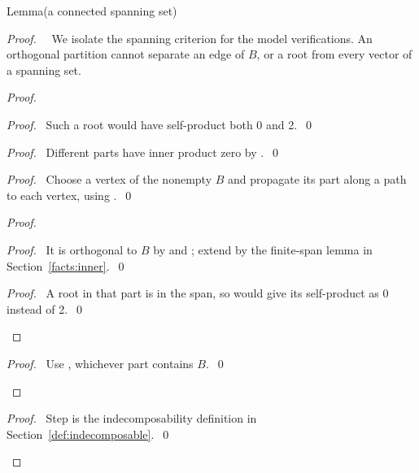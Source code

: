 \begin{namedresult}{Lemma}{(a connected spanning set)}\label{lem:sec3-connected-span}
\end{namedresult}
\begin{proof}
 \pfsketch\ \new\ We isolate the spanning criterion for the model verifications.
 An orthogonal partition cannot separate an edge of $B$, or a root
 from every vector of a spanning set.
 \begin{proof}
  \begin{proof}\pf\ Such a root would have self-product both 0 and 2.~\qed\end{proof}
  \begin{proof}\pf\ Different parts have inner product zero by .~\qed\end{proof}
  \begin{proof}\pf\ Choose a vertex of the nonempty $B$ and propagate its part
   along a path to each vertex, using .~\qed\end{proof}
  \begin{proof}
   \begin{proof}\pf\ It is orthogonal to $B$ by  and
    ; extend by the finite-span lemma in Section~\ref{facts:inner}.~\qed\end{proof}
   \qedstep
   \begin{proof}\pf\ A root in that part is in the span, so
     would give its self-product as 0 instead of 2.~\qed\end{proof}
  \end{proof}
  \qedstep
  \begin{proof}\pf\ Use , whichever part contains $B$.~\qed\end{proof}
 \end{proof}
 \qedstep
 \begin{proof}\pf\ Step  is the indecomposability definition in Section~\ref{def:indecomposable}.~\qed\end{proof}
\end{proof}

